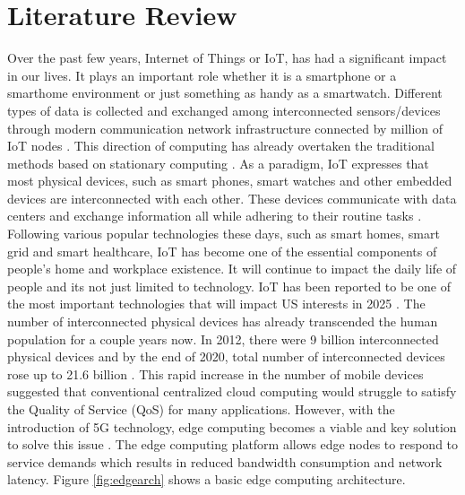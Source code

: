 \chapter{Literature Review}
Over the past few years, Internet of Things or IoT, has had a significant impact in our lives.
It plays an important role whether it is a smartphone or a smarthome environment or just something 
as handy as a smartwatch. Different types of data is collected and exchanged among interconnected 
sensors/devices through modern communication network infrastructure connected by million of 
IoT nodes \cite{8123913,7598173,7879243,6774858,10.1145/2872332}. This direction of computing 
has already overtaken the traditional methods based on stationary computing \cite{8058399}. 
As a paradigm, IoT expresses that most physical devices, such as smart phones, smart watches and 
other embedded devices are interconnected with each other. These devices communicate with data 
centers and exchange information \textemdash all while adhering to their routine tasks \cite{7879243}. \\
Following various popular technologies these days, such as smart homes, smart grid and smart healthcare, 
IoT has become one of the essential components of people's home and workplace existence. It will 
continue to impact the daily life of people and its not just limited to technology. IoT has been reported 
to be one of the most important technologies that will impact US interests in 2025 \cite{7879243}. 
The number of interconnected physical devices has already transcended the human population for a couple 
years now. In 2012, there were 9 billion interconnected physical devices \cite{8058399} and by the end of 
2020, total number of interconnected devices rose up to 21.6 billion \cite{numiot}. This rapid increase 
in the number of mobile devices suggested that conventional centralized cloud computing would struggle 
to satisfy the Quality of Service (QoS) for many applications. However, with the introduction of 5G 
technology, edge computing becomes a viable and key solution to solve this issue \cite{7568592,7414384,6568922}. 
The edge computing platform allows edge nodes to respond to service demands which results in reduced 
bandwidth consumption and network latency. Figure \ref{fig:edgearch} shows a basic edge computing architecture. \\ 
